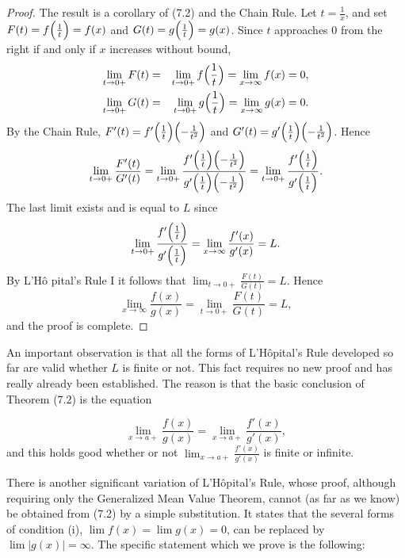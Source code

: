 \begin{proof}
The result is a corollary of (7.2) and the Chain Rule. Let $t = \frac{1}{x}$, and set $F(t) = f \Bigl( \frac{1}{t} \Bigr) = f(x)$ and $G(t) = g \Bigl( \frac{1}{t} \Bigr) = g(x)$. Since $t$ approaches 0 from the right if and only if $x$ increases without bound,
\begin{eqnarray*}
\lim_{t \rightarrow 0+} F(t) &=& \lim_{t \rightarrow 0+} f \Bigl( \frac{1}{t} \Bigr) = \lim_{x \rightarrow
\infty} f(x) = 0,
\\ \lim_{t \rightarrow 0+} G(t) &=& \lim_{t \rightarrow 0+} g \Bigl( \frac{1}{t} \Bigr) = \lim_{x \rightarrow
\infty} g(x) = 0. 
\end{eqnarray*}
By the Chain Rule, $F'(t) = f' \Bigl( \frac{1}{t} \Bigr) \Bigl(-\frac{1}{t^2} \Bigr)$ and $G'(t) = g' \Bigl( \frac{1}{t} \Bigr) \Bigl( -\frac{1}{t^2} \Bigr)$.
\noindent Hence
$$
\lim_{t \rightarrow 0+} \frac{ F'(t)}{G'(t)} = \lim_{t \rightarrow 0+}
\frac{f'\Bigl( \frac{1}{t} \Bigr) \Bigl( -\frac{1}{t^2} \Bigr)}{g' \Bigl( \frac{1}{t} \Bigr)
\Bigl( -\frac{1}{t^2} \Bigr)} 
= \lim_{t \rightarrow 0+}\frac{f' \Bigl( \frac{1}{t} \Bigr)}{g' \Bigl( \frac{1}{t} \Bigr)}.
$$
The last limit exists and is equal to $L$ since 
$$
\lim_{t \rightarrow 0+}\frac{f' \Bigl( \frac{1}{t} \Bigr)}{g' \Bigl(\frac{1}{t} \Bigr)} 
= \lim_{x \rightarrow \infty} \frac{f'(x)}{g'(x)} = L.
$$
By L'H\^{o} pital's Rule I it follows that $\lim_{t \rightarrow 0+} \frac{F(t)}{G(t)} = L$. Hence 
$$
\lim_{x \rightarrow \infty} \frac{f(x)}{g(x)} = \lim_{t \rightarrow 0+} \frac{F(t)}{G(t)} = L,
$$
\noindent and the proof is complete.
\end{proof}

An important observation is that all the forms of L'H\^{o}pital's Rule developed so far are valid whether $L$ is finite or not. This fact requires no new proof and has really already been established. The reason is that the basic conclusion of Theorem (7.2) is the equation

$$
\lim_{x \rightarrow a+}\frac{f(x)}{g(x)} = \lim_{x \rightarrow a+}\frac{f'(x)}{g'(x)},
$$
\noindent and this holds good whether or not $\lim_{x \rightarrow a+}\frac{f'(x)}{g'(x)}$ is finite or infinite.
\smallskip

There is another significant variation of L'H\^{o}pital's Rule, whose proof, although requiring only the Generalized Mean Value Theorem, cannot (as far as we know) be obtained from (7.2) by a simple substitution. It states that the several forms of condition (i), $\lim f(x) = \lim g(x)= 0$, can be replaced by $\lim |g(x)| = \infty$. The specific statement which we prove is the following:

